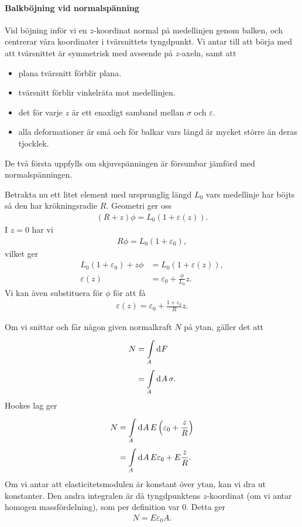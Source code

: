 \paragraph{Balkböjning vid normalspänning}
Vid böjning inför vi en $z$-koordinat normal på medellinjen genom balken, och centrerar våra koordinater i tvärsnittets tyngdpunkt. Vi antar till att börja med att tvärsnittet är symmetrisk med avseende på $z$-axeln, samt att
\begin{itemize}
	\item plana tvärsnitt förblir plana.
	\item tvärsnitt förblir vinkelräta mot medellinjen.
	\item det för varje $z$ är ett enaxligt samband mellan $\sigma$ och $\varepsilon$.
	\item alla deformationer är små och för balkar vars längd är mycket större än deras tjocklek.
\end{itemize}
De två första uppfylls om skjuvspänningen är försumbar jämförd med normalspänningen.

Betrakta nu ett litet element med ursprunglig längd $L_{0}$ vars medellinje har böjts så den har krökningsradie $R$. Geometri ger oss
\begin{align*}
	(R + z)\phi = L_{0}(1 + \varepsilon(z)).
\end{align*}
I $z = 0$ har vi
\begin{align*}
	R\phi = L_{0}(1 + \varepsilon_{0}),
\end{align*}
vilket ger
\begin{align*}
	L_{0}(1 + \varepsilon_{0}) + z\phi &= L_{0}(1 + \varepsilon(z)), \\
	\varepsilon(z)                     &= \varepsilon_{0} + \frac{\phi}{L_{0}}z.
\end{align*}
Vi kan även substituera för $\phi$ för att få
\begin{align*}
	\varepsilon(z) = \varepsilon_{0} + \frac{1 + \varepsilon_{0}}{R}z.
\end{align*}

Om vi snittar och får någon given normalkraft $N$ på ytan, gäller det att
\begin{align*}
	N &= \int\limits_{A}^{}\dd[]{F} \\
	  &= \int\limits_{A}^{}\dd[]{A}\sigma.
\end{align*}
Hookes lag ger
\begin{align*}
	N &= \int\limits_{A}^{}\dd[]{A}E\left(\varepsilon_{0} + \frac{z}{R}\right) \\
	  &= \int\limits_{A}^{}\dd[]{A}E\varepsilon_{0} + E\frac{z}{R}.
\end{align*}
Om vi antar att elasticitetsmodulen är konstant över ytan, kan vi dra ut konstanter. Den andra integralen är då tyngdpunktens $z$-koordinat (om vi antar homogen massfördelning), som per definition var $0$. Detta ger
\begin{align*}
	N = E\varepsilon_{0}A.
\end{align*}

